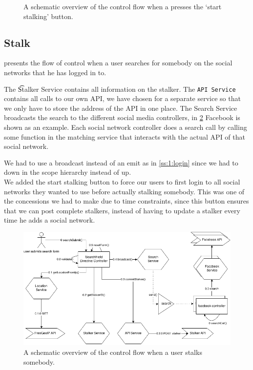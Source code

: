 		\begin{figure}
			\caption{A schematic overview of the control flow when a presses the `start stalking' button.}
			\label{fig:1:controlflowStartStalk}
		\end{figure}


\subsection{Stalk}
	 presents the flow of control when a user searches for somebody on the social networks that he has logged in to.

	The \t{Stalker Service} contains all information on the stalker. The \texttt{API Service} contains all calls to our own API, we have chosen for a separate service so that we only have to store the address of the API in one place. The Search Service broadcasts the search to the different social media controllers, in \cref{fig:1:controlflowStalk} Facebook is shown as an example. Each social network controller does a search call by calling some function in the matching service that interacts with the actual API of that social network.


	We had to use a broadcast instead of an emit as in \cref{ss:1:login} since we had to down in the scope hierarchy instead of up. \\

	We added the start stalking button to force our users to first login to all social networks they wanted to use before actually stalking somebody. This was one of the concessions we had to make due to time constraints, since this button ensures that we can post complete stalkers, instead of having to update a stalker every time he adds a social network. 

		\begin{figure}
			\includegraphics[width=\textwidth]{./img/1_stalking_flow}
			\caption{A schematic overview of the control flow when a user stalks somebody.}
			\label{fig:1:controlflowStalk}
		\end{figure}	

